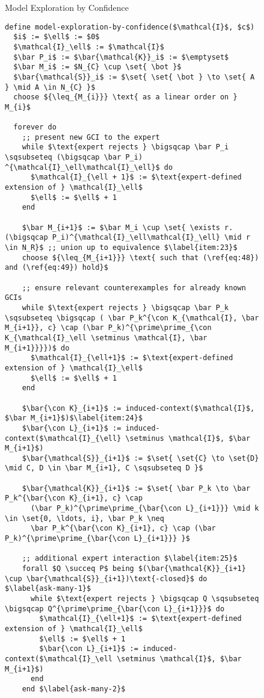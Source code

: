\begin{figure}[tp]
  \begin{Algorithm}
    \label{alg:model-exploration-by-confidence} Model Exploration by Confidence
    \begin{lstlisting}
define model-exploration-by-confidence($\mathcal{I}$, $c$)
  $i$ := $\ell$ := $0$
  $\mathcal{I}_\ell$ := $\mathcal{I}$
  $\bar P_i$ := $\bar{\mathcal{K}}_i$ := $\emptyset$
  $\bar M_i$ := $N_{C} \cup \set{ \bot }$
  $\bar{\mathcal{S}}_i$ := $\set{ \set{ \bot } \to \set{ A } \mid A \in N_{C} }$
  choose ${\leq_{M_{i}}} \text{ as a linear order on } M_{i}$

  forever do
    ;; present new GCI to the expert
    while $\text{expert rejects } \bigsqcap \bar P_i \sqsubseteq (\bigsqcap \bar P_i) ^{\mathcal{I}_\ell\mathcal{I}_\ell}$ do
      $\mathcal{I}_{\ell + 1}$ := $\text{expert-defined extension of } \mathcal{I}_\ell$
      $\ell$ := $\ell$ + 1
    end

    $\bar M_{i+1}$ := $\bar M_i \cup \set{ \exists r. (\bigsqcap P_i)^{\mathcal{I}_\ell\mathcal{I}_\ell} \mid r \in N_R}$ ;; union up to equivalence $\label{item:23}$
    choose ${\leq_{M_{i+1}}} \text{ such that (\ref{eq:48}) and (\ref{eq:49}) hold}$

    ;; ensure relevant counterexamples for already known GCIs
    while $\text{expert rejects } \bigsqcap \bar P_k \sqsubseteq \bigsqcap ( \bar P_k^{\con K_{\mathcal{I}, \bar M_{i+1}}, c} \cap (\bar P_k)^{\prime\prime_{\con K_{\mathcal{I}_\ell \setminus \mathcal{I}, \bar M_{i+1}}}})$ do
      $\mathcal{I}_{\ell+1}$ := $\text{expert-defined extension of } \mathcal{I}_\ell$
      $\ell$ := $\ell$ + 1
    end

    $\bar{\con K}_{i+1}$ := induced-context($\mathcal{I}$, $\bar M_{i+1}$)$\label{item:24}$
    $\bar{\con L}_{i+1}$ := induced-context($\mathcal{I}_{\ell} \setminus \mathcal{I}$, $\bar M_{i+1}$)  
    $\bar{\mathcal{S}}_{i+1}$ := $\set{ \set{C} \to \set{D} \mid C, D \in \bar M_{i+1}, C \sqsubseteq D }$

    $\bar{\mathcal{K}}_{i+1}$ := $\set{ \bar P_k \to \bar P_k^{\bar{\con K}_{i+1}, c} \cap
      (\bar P_k)^{\prime\prime_{\bar{\con L}_{i+1}}} \mid k \in \set{0, \ldots, i}, \bar P_k \neq
      \bar P_k^{\bar{\con K}_{i+1}, c} \cap (\bar P_k)^{\prime\prime_{\bar{\con L}_{i+1}}} }$

    ;; additional expert interaction $\label{item:25}$
    forall $Q \succeq P$ being $(\bar{\mathcal{K}}_{i+1} \cup \bar{\mathcal{S}}_{i+1})\text{-closed}$ do $\label{ask-many-1}$
      while $\text{expert rejects } \bigsqcap Q \sqsubseteq \bigsqcap Q^{\prime\prime_{\bar{\con L}_{i+1}}}$ do
        $\mathcal{I}_{\ell+1}$ := $\text{expert-defined extension of } \mathcal{I}_\ell$
        $\ell$ := $\ell$ + 1
        $\bar{\con L}_{i+1}$ := induced-context($\mathcal{I}_\ell \setminus \mathcal{I}$, $\bar M_{i+1}$)
      end
    end $\label{ask-many-2}$


\end{lstlisting}
\end{Algorithm}
\end{figure}
